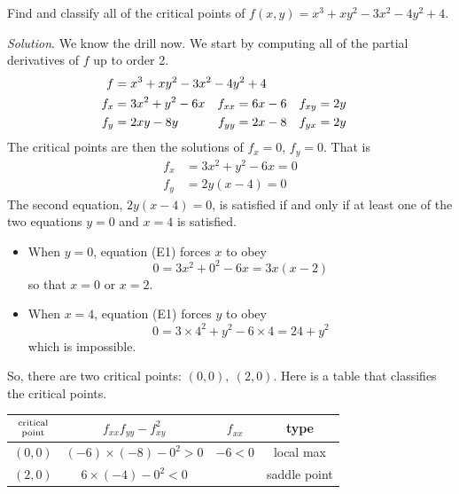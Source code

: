 \begin{eg}\label{eg max min A}
Find and classify all of the critical points of $f(x,y)=x^3+xy^2-3x^2-4y^2+4$.

\medskip
\noindent\textit{Solution}.
We know the drill now. We start by computing all of the partial 
derivatives of $f$ up to order 2.
\begin{align*}
f&=x^3+xy^2-3x^2-4y^2+4 \hidewidth\\
f_x&=3x^2+y^2-6x & f_{xx}&=6x-6 & f_{xy}&= 2y\\
f_y&=2xy-8y & f_{yy}&=2x-8  & f_{yx}&= 2y
\end{align*}
The critical points are then the solutions of $f_x=0$, $f_y=0$. That is
\begin{align*}
f_x&=3x^2+y^2-6x=0 \tag{E1}\\
f_y&=2y(x-4)=0 \tag{E2}
\end{align*}
The second equation, $2y(x-4)=0 $, is satisfied if and only if at least 
one of the two equations $y=0$ and $x=4$ is satisfied.
\begin{itemize}
\item
When $y=0$, equation (E1) forces $x$ to obey 
\begin{equation*}
0=3x^2+0^2-6x=3x(x-2)
\end{equation*}
so that $x=0$ or $x=2$.
\item
When $x=4$, equation (E1) forces $y$ to obey 
\begin{equation*}
0=3\times 4^2+y^2-6\times 4=24+y^2
\end{equation*} 
which is impossible.
\end{itemize}
So, there are two critical points: $(0,0),\ (2,0)$.
Here is a table that classifies the critical points.

\begin{center}
\renewcommand{\arraystretch}{1.5}
\begin{tabular}{ | c | c | c | c |}
\hline
$\Atop{\rm critical}{\rm point}$ & $f_{xx}f_{yy}-f_{xy}^2$ & $f_{xx}$ & type \\
\hline
$(0,0)$ & $(-6)\times (-8)-0^2>0$ & $-6<0$ & local max \\
\hline
$(2,0)$ & $6\times(-4)-0^2<0$ & & saddle point \\
\hline
\end{tabular}
\renewcommand{\arraystretch}{1.0}
\end{center}

\end{eg}



